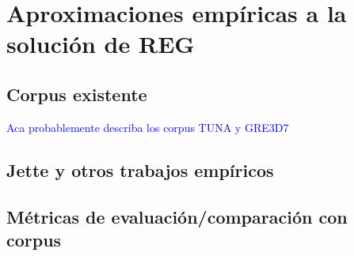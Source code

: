 




\section{Aproximaciones emp\'iricas a la soluci\'on de REG}



\subsection{Corpus existente}

\textcolor{blue}{Aca probablemente describa los corpus TUNA y GRE3D7}
\label{sec:corpusGRE}
\label{sec:corpusTUNA}

\subsection{Jette y otros trabajos emp\'iricos}

\subsection{M\'etricas de evaluaci\'on/comparaci\'on con corpus}



